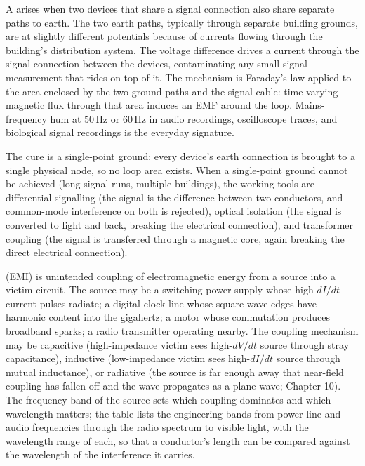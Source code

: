A  arises when two devices that share a signal
connection also share separate paths to earth. The two earth paths,
typically through separate building grounds, are at slightly different
potentials because of currents flowing through the building's
distribution system. The voltage difference drives a current through
the signal connection between the devices, contaminating any
small-signal measurement that rides on top of it. The mechanism is
Faraday's law applied to the area enclosed by the two ground paths
and the signal cable: time-varying magnetic flux through that area
induces an EMF around the loop. Mains-frequency hum at $50\,\si{\hertz}$
or $60\,\si{\hertz}$ in audio recordings, oscilloscope traces, and
biological signal recordings is the everyday signature.

The cure is a single-point ground: every device's earth connection is
brought to a single physical node, so no loop area exists. When a
single-point ground cannot be achieved (long signal runs, multiple
buildings), the working tools are differential signalling (the signal
is the difference between two conductors, and common-mode interference
on both is rejected), optical isolation (the signal is converted to
light and back, breaking the electrical connection), and transformer
coupling (the signal is transferred through a magnetic core, again
breaking the direct electrical connection).

 (EMI) is unintended coupling of
electromagnetic energy from a source into a victim circuit. The source
may be a switching power supply whose high-$dI/dt$ current pulses
radiate; a digital clock line whose square-wave edges have harmonic
content into the gigahertz; a motor whose commutation produces
broadband sparks; a radio transmitter operating nearby. The coupling
mechanism may be capacitive (high-impedance victim sees high-$dV/dt$
source through stray capacitance), inductive (low-impedance victim
sees high-$dI/dt$ source through mutual inductance), or radiative
(the source is far enough away that near-field coupling has fallen
off and the wave propagates as a plane wave; Chapter 10). The
frequency band of the source sets which coupling dominates and which
wavelength matters; the table 
lists the engineering bands from power-line and audio frequencies
through the radio spectrum to visible light, with the wavelength range
of each, so that a conductor's length can be compared against the
wavelength of the interference it carries.


